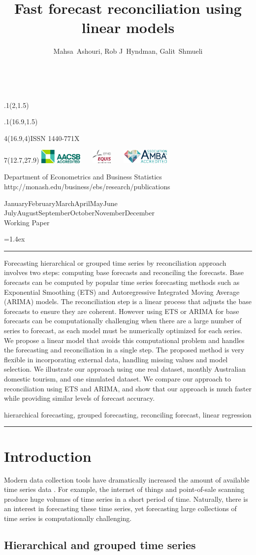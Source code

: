 \documentclass[11pt,a4paper,]{article}
\title{Fast forecast reconciliation using linear models}
\author{Mahsa~Ashouri, Rob J~Hyndman, Galit~Shmueli}
\date{\sf\Date~\Month~\Year}
\makeatletter
\def\Date{\number\day}
\def\Month{\ifcase\month\or
 January\or February\or March\or April\or May\or June\or
 July\or August\or September\or October\or November\or December\fi}
\def\Year{\number\year}
\def\showjel{{\large\textsf{\textbf{JEL classification:}}~\@jel}}
\def\cover{{\sffamily\setcounter{page}{0}
        \thispagestyle{empty}
        \placefig{2}{1.5}{width=5cm}{monash2}
        \placefig{16.9}{1.5}{width=2.1cm}{MBusSchool}
        \begin{textblock}{4}(16.9,4)ISSN 1440-771X\end{textblock}
        \begin{textblock}{7}(12.7,27.9)\hfill
        \includegraphics[height=0.7cm]{AACSB}~~~
        \includegraphics[height=0.7cm]{EQUIS}~~~
        \includegraphics[height=0.7cm]{AMBA}
        \end{textblock}
        \vspace*{2cm}
        \begin{center}\Large
        Department of Econometrics and Business Statistics\\[.5cm]
        \footnotesize http://monash.edu/business/ebs/research/publications
        \end{center}\vspace{2cm}
        \begin{center}
        \fbox{\parbox{14cm}{\begin{onehalfspace}\centering\Huge\vspace*{0.3cm}
                \textsf{\textbf{\expandafter{\@title}}}\vspace{1cm}\par
                \LARGE\@author\end{onehalfspace}
        }}
        \end{center}
        \vfill
                \begin{center}\Large
                \Month~\Year\\[1cm]
                Working Paper \@wp
        \end{center}\vspace*{2cm}}}
\def\pageone{{\sffamily\setstretch{1}%
        \thispagestyle{empty}%
        \vbox to \textheight{%
        \raggedright\baselineskip=1.2cm
     {\fontsize{24.88}{30}\sffamily\textbf{\expandafter{\@title}}}
        \vspace{2cm}\par
        \hspace{1cm}\parbox{14cm}{\sffamily\large\@addresses}\vspace{1cm}\vfill
        \hspace{1cm}{\large\Date~\Month~\Year}\\[1cm]
        \hspace{1cm}\showjel\vss}}}
\def\blindtitle{{\sffamily
     \thispagestyle{plain}\raggedright\baselineskip=1.2cm
     {\fontsize{24.88}{30}\sffamily\textbf{\expandafter{\@title}}}\vspace{1cm}\par
        }}
\def\titlepage{{\cover\newpage\pageone\newpage\blindtitle}}
\let\maketitle\titlepage
\newenvironment{keywords}{\par\vspace{0.5cm}\noindent{\sffamily\textbf{Keywords:}}}{\vspace{0.25cm}\par\hrule\vspace{0.5cm}\par}
\renewenvironment{abstract}{\begin{minipage}{\textwidth}\parskip=1.4ex\noindent
\hrule\vspace{0.1cm}\par{\sffamily\textbf{\abstractname}}\newline}
  {\end{minipage}}
\def\placefig#1#2#3#4{\begin{textblock}{.1}(#1,#2)\rlap{\texttt{[image: \#4]}}\end{textblock}}
\makeatother
\begin{document}
\maketitle
\begin{abstract}
Forecasting hierarchical or grouped time series by reconciliation approach involves two steps: computing base forecasts and reconciling the forecasts. Base forecasts can be computed by popular time series forecasting methods such as Exponential Smoothing (ETS) and Autoregressive Integrated Moving Average (ARIMA) models. The reconciliation step is a linear process that adjusts the base forecasts to ensure they are coherent. However using ETS or ARIMA for base forecasts can be computationally challenging when there are a large number of series to forecast, as each model must be numerically optimized for each series. We propose a linear model that avoids this computational problem and handles the forecasting and reconciliation in a single step. The proposed method is very flexible in incorporating external data, handling missing values and model selection. We illustrate our approach using one real dataset, monthly Australian domestic tourism, and one simulated dataset. We compare our approach to reconciliation using ETS and ARIMA, and show that our approach is much faster while providing similar levels of forecast accuracy.
\end{abstract}
\begin{keywords}
hierarchical forecasting, grouped forecasting, reconciling forecast, linear regression
\end{keywords}

\hypertarget{introduction}{%
\section{Introduction}\label{introduction}}

Modern data collection tools have dramatically increased the amount of available time series data \autocite{januschowski2013forecasting}. For example, the internet of things and point-of-sale scanning produce huge volumes of time series in a short period of time. Naturally, there is an interest in forecasting these time series, yet forecasting large collections of time series is computationally challenging.

\hypertarget{hierarchical-and-grouped-time-series}{%
\subsection{Hierarchical and grouped time series}\label{hierarchical-and-grouped-time-series}}
\end{document}
